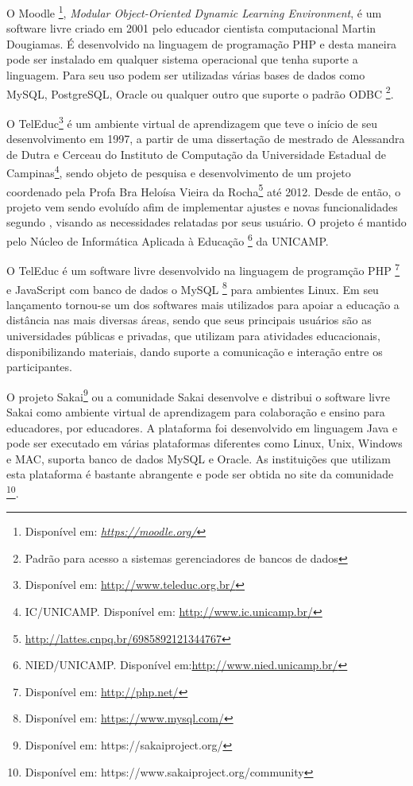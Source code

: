 O Moodle \footnote{Disponível em: \textit{ \url{https://moodle.org/}}}, \textit{Modular Object-Oriented Dynamic Learning Environment}, é um software livre criado em 2001 pelo educador cientista computacional Martin Dougiamas. É desenvolvido na linguagem de programação PHP e desta maneira pode ser instalado em qualquer sistema operacional que tenha suporte a linguagem. Para seu uso podem ser utilizadas várias bases de dados como MySQL, PostgreSQL, Oracle ou qualquer outro que suporte o padrão ODBC \footnote{Padrão para acesso a sistemas gerenciadores de bancos de dados}.


O TelEduc\footnote{Disponível em: \url{http://www.teleduc.org.br/}} é um ambiente virtual de aprendizagem que teve o início de seu desenvolvimento em 1997, a partir de uma dissertação de mestrado de Alessandra de Dutra e Cerceau do Instituto de Computação da Universidade Estadual de Campinas\footnote{IC/UNICAMP. Disponível em: \url{http://www.ic.unicamp.br/}}, sendo objeto de pesquisa e desenvolvimento de um projeto coordenado pela Profa Bra Heloísa Vieira da Rocha\footnote{\url{http://lattes.cnpq.br/6985892121344767}} até 2012. Desde de então, o projeto vem sendo evoluído afim de implementar ajustes e novas funcionalidades segundo \cite{rocha2002ambiente}, visando as necessidades relatadas por seus usuário. O projeto é mantido pelo Núcleo de Informática Aplicada à Educação \footnote{NIED/UNICAMP. Disponível em:\url{http://www.nied.unicamp.br/}} da UNICAMP.

O TelEduc é um software livre desenvolvido na linguagem de programção PHP \footnote{Disponível em: \url{http://php.net/}} e JavaScript com banco de dados o MySQL \footnote{Disponível em: \url{https://www.mysql.com/}} para ambientes Linux. Em seu lançamento tornou-se um dos softwares mais utilizados para apoiar a educação a distância nas mais diversas áreas, sendo que seus principais usuários são as universidades públicas e privadas, que utilizam para atividades educacionais, disponibilizando materiais, dando suporte a comunicação e interação entre os participantes.

O projeto Sakai\footnote{Disponível em: https://sakaiproject.org/ } ou a comunidade Sakai desenvolve e distribui o software livre Sakai como ambiente virtual de aprendizagem para colaboração e ensino para educadores, por educadores. A plataforma foi desenvolvido em linguagem Java e pode ser executado em várias plataformas diferentes como Linux, Unix, Windows e MAC, suporta banco de dados MySQL e Oracle. As instituições que utilizam esta plataforma é bastante abrangente e pode ser obtida no site da comunidade \footnote{Disponível em: https://www.sakaiproject.org/community}.


